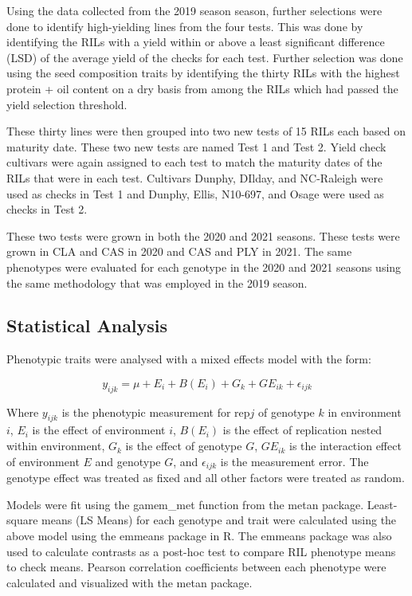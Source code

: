 \documentclass[Agronomy,article,submit,moreauthors,pdftex]{mdpi}
\begin{document}
Using the data collected from the 2019 season season, further selections
were done to identify high-yielding lines from the four tests. This was
done by identifying the RILs with a yield within or above a least
significant difference (LSD) of the average yield of the checks for each
test. Further selection was done using the seed composition traits by
identifying the thirty RILs with the highest protein + oil content on a
dry basis from among the RILs which had passed the yield selection
threshold.

These thirty lines were then grouped into two new tests of 15 RILs each
based on maturity date. These two new tests are named Test 1 and Test 2.
Yield check cultivars were again assigned to each test to match the
maturity dates of the RILs that were in each test. Cultivars Dunphy,
DIlday, and NC-Raleigh were used as checks in Test 1 and Dunphy, Ellis,
N10-697, and Osage were used as checks in Test 2.

These two tests were grown in both the 2020 and 2021 seasons. These
tests were grown in CLA and CAS in 2020 and CAS and PLY in 2021. The
same phenotypes were evaluated for each genotype in the 2020 and 2021
seasons using the same methodology that was employed in the 2019 season.

\hypertarget{statistical-analysis}{%
\subsection{Statistical Analysis}\label{statistical-analysis}}

Phenotypic traits were analysed with a mixed effects model with the
form:

\[y_{ijk} = \mu + E_i + B(E_i) + G_k + GE_{ik} + \epsilon_{ijk}\]

Where \(y_{ijk}\) is the phenotypic measurement for rep\(j\) of genotype
\(k\) in environment \(i\), \(E_i\) is the effect of environment \(i\),
\(B(E_i)\) is the effect of replication nested within environment,
\(G_k\) is the effect of genotype \(G\), \(GE_{ik}\) is the interaction
effect of environment \(E\) and genotype \(G\), and \(\epsilon_{ijk}\)
is the measurement error. The genotype effect was treated as fixed and
all other factors were treated as random.

Models were fit using the gamem\_met function from the metan
package\citep{olivotoMetanPackageMultienvironment2020}. Least-square
means (LS Means) for each genotype and trait were calculated using the
above model using the emmeans
package\citep{lenthEmmeansEstimatedMarginal2022} in R. The emmeans
package was also used to calculate contrasts as a post-hoc test to
compare RIL phenotype means to check means. Pearson correlation
coefficients between each phenotype were calculated and visualized with
the metan package.
\end{document}
